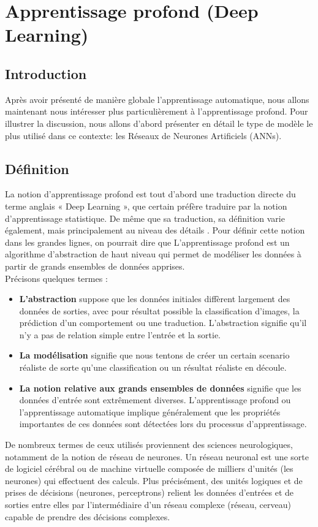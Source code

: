 \documentclass[12pt]{article}
\begin{document}
\newpage
\section{Apprentissage profond (Deep Learning)}
\subsection{Introduction}
Après avoir présenté de manière globale l’apprentissage automatique, nous allons maintenant nous intéresser plus particulièrement à l’apprentissage profond. Pour illustrer la discussion, nous allons d’abord présenter en détail le type de modèle le plus utilisé dans ce contexte: les Réseaux de Neurones Artificiels (ANNs).
\subsection{Définition}
La notion d’apprentissage profond est tout d’abord une traduction directe du terme anglais « Deep Learning », que certain préfère traduire par la notion d’apprentissage statistique. De même que sa traduction, sa définition varie également, mais principalement au niveau des détails \cite{10}. %
Pour définir cette notion dans les grandes lignes, on pourrait dire que L’apprentissage profond est un algorithme d'abstraction de haut niveau qui permet de modéliser les données à partir de grands ensembles de données apprises.\\
Précisons quelques termes \cite{10}:
\begin{itemize}
	\item \textbf{L'abstraction} suppose que les données initiales diffèrent largement des données de sorties, avec pour résultat possible la classification d’images, la prédiction d’un comportement ou une traduction. L'abstraction signifie qu'il n'y a pas de relation simple entre l'entrée et la sortie.
	\item \textbf{La modélisation} signifie que nous tentons de créer un certain scenario réaliste de sorte qu'une classification ou un résultat réaliste en découle.
	\item \textbf{La notion relative aux grands ensembles de données} signifie que les données d’entrée sont extrêmement diverses. L'apprentissage profond ou l'apprentissage automatique implique généralement que les propriétés importantes de ces données sont détectées lors du processus d'apprentissage.
\end{itemize}

De nombreux termes de ceux utilisés proviennent des sciences neurologiques, notamment de la notion de réseau de neurones. Un réseau neuronal est une sorte de logiciel cérébral ou de machine virtuelle composée de milliers d’unités (les neurones) qui effectuent des calculs. Plus précisément, des unités logiques et de prises de décisions (neurones, perceptrons) relient les données d’entrées et de sorties entre elles par l’intermédiaire d’un réseau complexe (réseau, cerveau) capable de prendre des décisions complexes.
\end{document}
